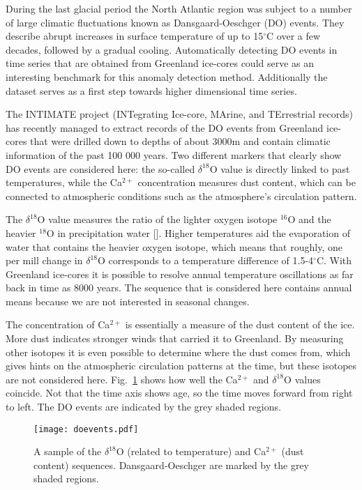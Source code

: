 During the last glacial period the North Atlantic region was subject to a
number of large climatic fluctuations known as Dansgaard-Oeschger (DO) events.
They describe abrupt increases in surface temperature of up to 15$^\circ$C over
a few decades, followed by a gradual cooling. Automatically detecting DO events
in time series that are obtained from Greenland ice-cores could serve as an
interesting benchmark for this anomaly detection method. Additionally the
dataset serves as a first step towards higher dimensional time series.

The INTIMATE project (INTegrating Ice-core, MArine, and TErrestrial records)
has recently managed to extract records of the DO events from Greenland
ice-cores that were drilled down to depths of about 3000m and contain climatic
information of the past 100 000 years.  Two different markers that clearly show
DO events are considered here: the so-called $\delta^{18}$O value is directly
linked to past temperatures, while the Ca$^{2+}$ concentration measures dust
content, which can be connected to atmospheric conditions such as the
atmosphere's circulation pattern.

The $\delta^{18}$O value measures the ratio of the lighter oxygen isotope
$^{16}$O and the heavier $^{18}$O in precipitation water [\cite{rasmussen2014}].
Higher temperatures aid the evaporation of water that contains the heavier
oxygen isotope, which means that roughly, one per mill change in $\delta^{18}$O
corresponds to a temperature difference of 1.5-4$^\circ$C.  With Greenland
ice-cores it is possible to resolve annual temperature oscillations as far back
in time as 8000 years. The sequence that is considered here contains annual
means because we are not interested in seasonal changes.

The concentration of Ca$^{2+}$ is essentially a measure of the dust content of
the ice. More dust indicates stronger winds that carried it to Greenland. By
measuring other isotopes it is even possible to determine where the dust comes
from, which gives hints on the atmospheric circulation patterns at the time,
but these isotopes are not considered here.  Fig.~\ref{fig:doevents} shows how
well the Ca$^{2+}$ and $\delta^{18}$O values coincide. Not that the time axis
shows age, so the time moves forward from right to left. The DO events are
indicated by the grey shaded regions.

\begin{figure}
  \centering
  \texttt{[image: doevents.pdf]}
  \caption{A sample of the $\delta^{18}$O (related to temperature) and
  Ca$^{2+}$ (dust content) sequences.  Dansgaard-Oeschger are marked by the
  grey shaded regions.}
  \label{fig:doevents}
\end{figure}



